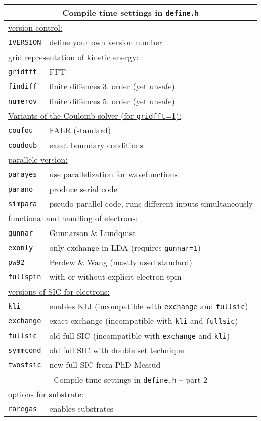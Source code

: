 \documentclass[12pt]{article}
\begin{document}
\begin{tabular}{ll}
\hline
\multicolumn{2}{c}{Compile time settings in {\tt define.h}} \\
\hline
\multicolumn{2}{l}{\underline{version control:}}\\
{\tt IVERSION} & define your own version number\\
\hline
\multicolumn{2}{l}{\underline{grid representation of kinetic energy:}}\\
{\tt gridfft} & FFT \\
{\tt findiff} & finite diffences 3. order (yet unsafe)\\
{\tt numerov} & finite diffences 5. order (yet unsafe)\\
\hline
\multicolumn{2}{l}{\underline{Variants of the Coulomb solver (for {\tt gridfft}=1):}}\\
{\tt coufou} & FALR (standard)\\
{\tt coudoub} & exact boundary conditions\\
\hline
\multicolumn{2}{l}{\underline{parallele version:}}\\
{\tt parayes} & use parallelization for wavefunctions \\
{\tt parano}  & produce serial code\\
{\tt simpara} & pseudo-parallel code, runs different inputs
simultaneously\\
\hline
\multicolumn{2}{l}{\underline{functional and handling of electrons:}}\\
{\tt gunnar} & Gunnarson \& Lundquist\\
{\tt exonly} & only exchange in  LDA (requires {\tt gunnar=1})\\
{\tt pw92} & Perdew \& Wang (mostly used standard)\\
{\tt fullspin} & with or without explicit electron  spin\\
\hline
\multicolumn{2}{l}{\underline{versions of SIC for electrons:}}\\
{\tt kli} & enables KLI (incompatible with {\tt exchange} and {\tt fullsic})\\
{\tt exchange} & exact exchange (incompatible with {\tt kli} and {\tt fullsic})\\
{\tt fullsic} & old full SIC  (incompatible with {\tt exchange} and {\tt kli})\\
{\tt symmcond} & old full SIC with double set technique\\
{\tt twostsic} & new full SIC from PhD Messud\\
\hline
\multicolumn{2}{c}{Compile time settings in {\tt define.h} -- part 2} \\
\hline
\multicolumn{2}{l}{\underline{options for substrate:}}\\
{\tt raregas} & enables substrates\\
\hline
\end{tabular}
\end{document}
